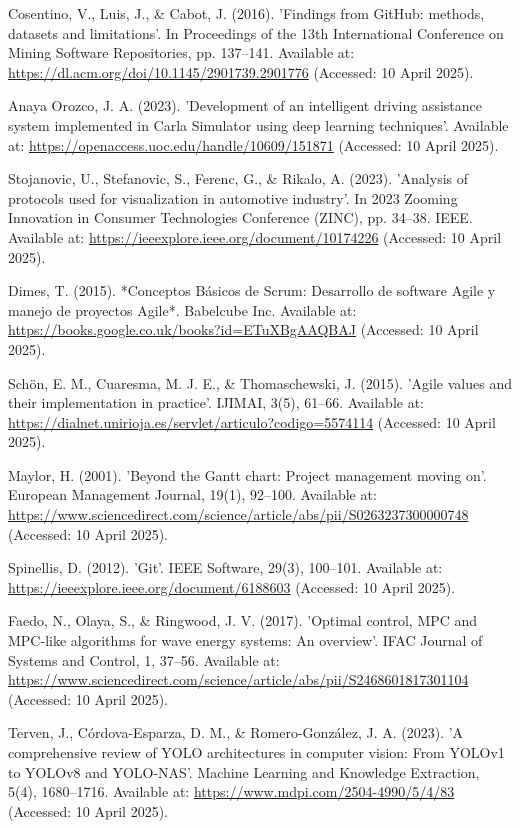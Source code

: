 \documentclass[a4paper,11pt]{report}
\begin{document}
\begin{thebibliography}{28}
     Cosentino, V., Luis, J., \& Cabot, J. (2016). 'Findings from GitHub: methods, datasets and limitations'. In Proceedings of the 13th International Conference on Mining Software Repositories, pp. 137–141. Available at: \url{https://dl.acm.org/doi/10.1145/2901739.2901776} (Accessed: 10 April 2025).

     Anaya Orozco, J. A. (2023). 'Development of an intelligent driving assistance system implemented in Carla Simulator using deep learning techniques'. Available at: \url{https://openaccess.uoc.edu/handle/10609/151871} (Accessed: 10 April 2025).

     Stojanovic, U., Stefanovic, S., Ferenc, G., \& Rikalo, A. (2023). 'Analysis of protocols used for visualization in automotive industry'. In 2023 Zooming Innovation in Consumer Technologies Conference (ZINC), pp. 34–38. IEEE. Available at: \url{https://ieeexplore.ieee.org/document/10174226} (Accessed: 10 April 2025).

     Dimes, T. (2015). *Conceptos Básicos de Scrum: Desarrollo de software Agile y manejo de proyectos Agile*. Babelcube Inc. Available at: \url{https://books.google.co.uk/books?id=ETuXBgAAQBAJ} (Accessed: 10 April 2025).

     Schön, E. M., Cuaresma, M. J. E., \& Thomaschewski, J. (2015). 'Agile values and their implementation in practice'. IJIMAI, 3(5), 61–66. Available at: \url{https://dialnet.unirioja.es/servlet/articulo?codigo=5574114} (Accessed: 10 April 2025).

     Maylor, H. (2001). 'Beyond the Gantt chart: Project management moving on'. European Management Journal, 19(1), 92–100. Available at: \url{https://www.sciencedirect.com/science/article/abs/pii/S0263237300000748} (Accessed: 10 April 2025).

     Spinellis, D. (2012). 'Git'. IEEE Software, 29(3), 100–101. Available at: \url{https://ieeexplore.ieee.org/document/6188603} (Accessed: 10 April 2025).

     Faedo, N., Olaya, S., \& Ringwood, J. V. (2017). 'Optimal control, MPC and MPC-like algorithms for wave energy systems: An overview'. IFAC Journal of Systems and Control, 1, 37–56. Available at: \url{https://www.sciencedirect.com/science/article/abs/pii/S2468601817301104} (Accessed: 10 April 2025).

     Terven, J., Córdova-Esparza, D. M., \& Romero-González, J. A. (2023). 'A comprehensive review of YOLO architectures in computer vision: From YOLOv1 to YOLOv8 and YOLO-NAS'. Machine Learning and Knowledge Extraction, 5(4), 1680–1716. Available at: \url{https://www.mdpi.com/2504-4990/5/4/83} (Accessed: 10 April 2025).


\end{thebibliography}
\end{document}
